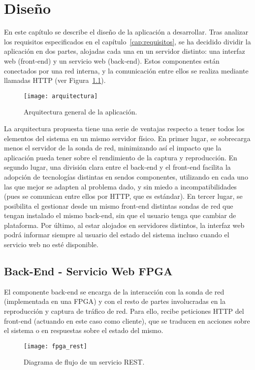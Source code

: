 \chapter{Diseño\label{cap:disenho}}

En este capítulo se describe el diseño de la aplicación a desarrollar.
Tras analizar los requisitos especificados en el capítulo~\ref{cap:requisitos}, se ha decidido dividir la aplicación en dos partes, alojadas cada una en un servidor distinto: una interfaz web (\gls{front-end}) y un servicio web (\gls{back-end}).
Estos componentes están conectados por una red interna, y la comunicación entre ellos se realiza mediante llamadas  \gls{HTTP} (ver Figura~\ref{fig:arquitectura}).

\begin{figure}[!htp]
  \centering
  \texttt{[image: arquitectura]}
  \caption{Arquitectura general de la aplicación.}
  \label{fig:arquitectura}
\end{figure}

La arquitectura propuesta tiene una serie de ventajas respecto a tener todos los elementos del sistema en un mismo servidor físico.
En primer lugar, se sobrecarga menos el servidor de la sonda de red, minimizando así el impacto que la aplicación pueda tener sobre el rendimiento de la captura y reproducción.
En segundo lugar, una división clara entre el \gls{back-end} y el \gls{front-end} facilita la adopción de tecnologías distintas en sendos componentes, utilizando en cada uno las que mejor se adapten al problema dado, y sin miedo a incompatibilidades (pues se comunican entre ellos por \gls{HTTP}, que es estándar).
En tercer lugar, se posibilita el gestionar desde un mismo \gls{front-end} distintas sondas de red que tengan instalado el mismo \gls{back-end}, sin que el usuario tenga que cambiar de plataforma.
Por último, al estar alojados en servidores distintos, la interfaz web podrá informar siempre al usuario del estado del sistema incluso cuando el servicio web no esté disponible.


\section{Back-End - Servicio Web FPGA\label{sec:dis:servicio_web_fpga}}

El componente \gls{back-end} se encarga de la interacción con la sonda de red (implementada en una \gls{FPGA}) y con el resto de partes involucradas en la reproducción y captura de tráfico de red.
Para ello, recibe peticiones \gls{HTTP} del \gls{front-end} (actuando en este caso como cliente), que se traducen en acciones sobre el sistema o en respuestas sobre el estado del mismo.
\begin{figure}[!htp]
  \centering
  \texttt{[image: fpga\_rest]}
  \caption{Diagrama de flujo de un servicio \gls{REST}.}
  \label{fig:fpga_rest}
\end{figure}

